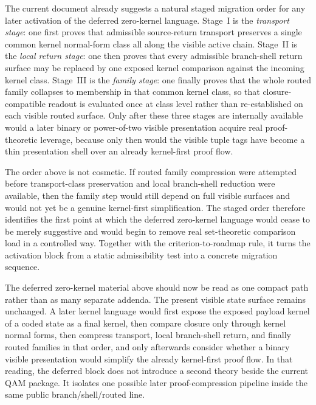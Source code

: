 \begin{remark}\label{rem:qam-zero-kernel-roadmap}
The current document already suggests a natural staged migration order for any later activation of the deferred zero-kernel language.
Stage~I is the \emph{transport stage}: one first proves that admissible source-return transport preserves a single common kernel normal-form class all along the visible active chain.
Stage~II is the \emph{local return stage}: one then proves that every admissible branch-shell return surface may be replaced by one exposed kernel comparison against the incoming kernel class.
Stage~III is the \emph{family stage}: one finally proves that the whole routed family collapses to membership in that common kernel class, so that closure-compatible readout is evaluated once at class level rather than re-established on each visible routed surface.
Only after these three stages are internally available would a later binary or power-of-two visible presentation acquire real proof-theoretic leverage, because only then would the visible tuple tags have become a thin presentation shell over an already kernel-first proof flow.
\end{remark}

\begin{remark}\label{rem:qam-zero-kernel-roadmap-why}
The order above is not cosmetic. If routed family compression were attempted before transport-class preservation and local branch-shell reduction were available, then the family step would still depend on full visible surfaces and would not yet be a genuine kernel-first simplification. The staged order therefore identifies the first point at which the deferred zero-kernel language would cease to be merely suggestive and would begin to remove real set-theoretic comparison load in a controlled way. Together with the criterion-to-roadmap rule, it turns the activation block from a static admissibility test into a concrete migration sequence.
\end{remark}

\begin{remark}\label{rem:qam-zero-kernel-synthesis}
The deferred zero-kernel material above should now be read as one compact path rather than as many separate addenda. The present visible state surface remains unchanged. A later kernel language would first expose the exposed payload kernel of a coded state as a final kernel, then compare closure only through kernel normal forms, then compress transport, local branch-shell return, and finally routed families in that order, and only afterwards consider whether a binary visible presentation would simplify the already kernel-first proof flow. In that reading, the deferred block does not introduce a second theory beside the current QAM package. It isolates one possible later proof-compression pipeline inside the same public branch/shell/routed line.
\end{remark}

